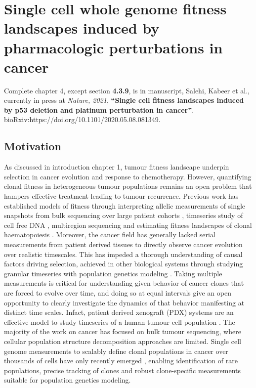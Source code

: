 
{\chapter{Single  cell  whole genome fitness  landscapes  induced  by pharmacologic perturbations in cancer}
}
\label{ch:Chapter4}
Complete chapter 4, except section \textbf{4.3.9}, is in manuscript, Salehi, Kabeer et al., currently in press at \textit{Nature, 2021}, \textbf{``Single cell fitness landscapes induced by p53 deletion and platinum perturbation in cancer''}. bioRxiv:https://doi.org/10.1101/2020.05.08.081349.

\section{Motivation}
As discussed in introduction chapter 1, tumour fitness landscape underpin selection in cancer evolution and response to chemotherapy. However, quantifying clonal fitness in heterogeneous tumour populations remains an open problem that hampers effective treatment leading to tumour recurrence. Previous work has established models of fitness through interpreting allelic measurements of single snapshots \cite{williams2016identification, williams2018quantification,gerstung2020evolutionary,shah2012clonal,nik2012life} from bulk sequencing over large patient cohorts \cite{martincorena2017universal}, timeseries study of cell free DNA \cite{khan2018longitudinal}, multiregion sequencing \cite{Gerlinger2014-qd,Jamal-Hanjani2017-yc,Lopez2020-ku,mcpherson2016divergent,williams2018quantification} and estimating fitness landscapes of clonal haematopoiesis \cite{Watson2020-yu}. Moreover, the cancer field has generally lacked serial measurements from patient derived tissues to directly observe cancer evolution over realistic timescales. This has impeded a thorough understanding of causal factors driving selection, achieved in other biological systems through studying granular timeseries with population genetics modeling \cite{good2017dynamics}. Taking multiple measurements is critical for understanding  given behavior of cancer clones that are forced to evolve over time, and doing so at equal intervals give an open opportunity to clearly investigate the dynamics of that behavior manifesting at distinct time scales. Infact, patient derived xenograft (PDX)\cite{aparicio2015examining} systems are an effective model to study timeseries of a human tumour cell population \cite{williams2018using,willey2015patient}.
The majority of the work on cancer has focused on bulk tumour sequencing, where cellular population structure decomposition approaches are limited. Single cell genome measurements to scalably define clonal populations in cancer over thousands of cells have only recently emerged \cite{Laks2019-dm,zahn2017scalable}, enabling identification of rare populations, precise tracking of clones and robust clone-specific measurements suitable for population genetics modeling. 
